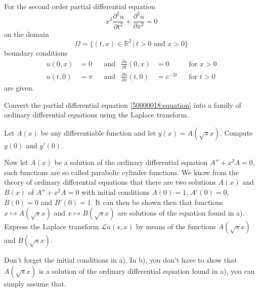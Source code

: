 For the second order partial differential equation 
\begin{equation}
x^2 \frac{\partial^2 u}{\partial t^2}
+
\frac{\partial^2 u}{\partial x^2}
=
0
\label{50000018:equation}
\end{equation}
on the domain 
\[
\Omega
= 
\{ (t,x)\in\mathbb R^2\,|\, t>0 \text{ and } x > 0\}
\]
boundary conditions
\[
\begin{aligned}
u(0,x) &= 0 & &\text{and}& \frac{\partial u}{\partial t}(0,x) &= 0 & &\text{for $x>0$}\\
u(t,0) &= \pi &&\text{and}&\frac{\partial u}{\partial x}(t,0)&=e^{-2t} &&\text{for $t>0$}
\end{aligned}
\]
are given.
\begin{teilaufgaben}
\item
Convert the partial differential equation \eqref{50000018:equation} into
a family of ordinary differential equations using the Laplace transform.
\item
Let $A(x)$ be any differentiable function and let $y(x)=A(\!\sqrt{s}x)$.
Compute $y(0)$ and $y'(0)$.
\item
Now let $A(x)$ be a solution of the ordinary differential equation
$A''+x^2A=0$, such functions are so called parabolic cylinder functions.
We know from the theory of ordinary differential equations that there are
two solutions $A(x)$ and $B(x)$ of $A''+x^2A=0$ with initial conditions
$A(0)=1$, $A'(0)=0$, $B(0)=0$ and $B'(0)=1$.
It can then be shown then that functions $x\mapsto A(\!\sqrt{s}x)$
and $x\mapsto B(\!\sqrt{s}x)$  are solutions of the equation found in a).
Express the Laplace transform $\mathscr{L}u(s,x)$ by means of the functions
$A(\!\sqrt{s}x)$ and $B(\!\sqrt{s}x)$.
\end{teilaufgaben}

\begin{hinweis}
Don't forget the initial conditions in a).
In b), you don't have to show that $A(\!\sqrt{s}x)$ is a solution of the
ordinary differential equation found in a), you can simply assume that.
\end{hinweis}

